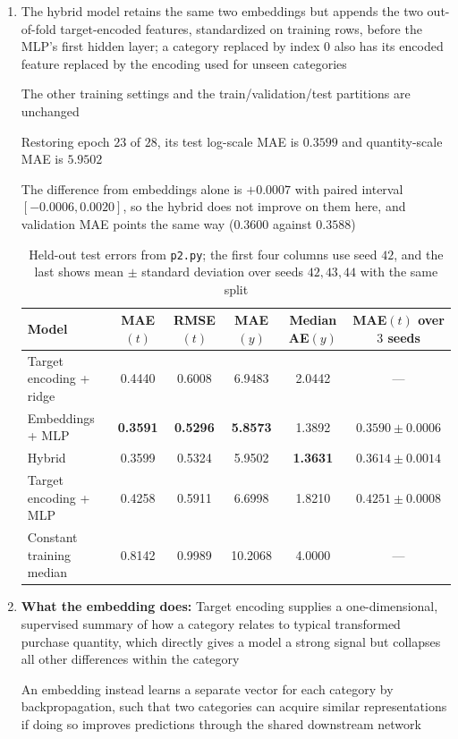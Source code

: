 \documentclass{article}
\begin{document}
\begin{enumerate}[label=\alph*.]
\item The hybrid model retains the same two embeddings but appends the two out-of-fold target-encoded features, standardized on training rows, before the MLP's first hidden layer; a category replaced by index $0$ also has its encoded feature replaced by the encoding used for unseen categories

The other training settings and the train/validation/test partitions are unchanged

Restoring epoch $23$ of $28$, its test log-scale MAE is $\boxed{0.3599}$ and quantity-scale MAE is $5.9502$

The difference from embeddings alone is $+0.0007$ with paired interval $[-0.0006,0.0020]$, so the hybrid does not improve on them here, and validation MAE points the same way ($0.3600$ against $0.3588$)

\begin{table}[H]
\centering
\begin{tabular}{lccccc}
\toprule
Model & MAE$(t)$ & RMSE$(t)$ & MAE$(y)$ & Median AE$(y)$ & MAE$(t)$ over $3$ seeds \\
\midrule
Target encoding + ridge & 0.4440 & 0.6008 & 6.9483 & 2.0442 & --- \\
Embeddings + MLP & \textbf{0.3591} & \textbf{0.5296} & \textbf{5.8573} & 1.3892 & $0.3590\pm 0.0006$ \\
Hybrid & 0.3599 & 0.5324 & 5.9502 & \textbf{1.3631} & $0.3614\pm 0.0014$ \\
\midrule
Target encoding + MLP & 0.4258 & 0.5911 & 6.6998 & 1.8210 & $0.4251\pm 0.0008$ \\
Constant training median & 0.8142 & 0.9989 & 10.2068 & 4.0000 & --- \\
\bottomrule
\end{tabular}
\caption{Held-out test errors from \texttt{p2.py}; the first four columns use seed $42$, and the last shows mean $\pm$ standard deviation over seeds $42,43,44$ with the same split}
\end{table}

\item \textbf{What the embedding does:} Target encoding supplies a one-dimensional, supervised summary of how a category relates to typical transformed purchase quantity, which directly gives a model a strong signal but collapses all other differences within the category

An embedding instead learns a separate vector for each category by backpropagation, such that two categories can acquire similar representations if doing so improves predictions through the shared downstream network


\end{enumerate}
\end{document}
